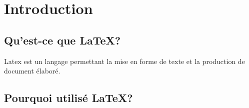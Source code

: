 \documentclass[../main.tex]{subfiles}
\begin{document}
\chapter{Introduction}

\section{Qu'est-ce que \LaTeX ?}

Latex est un langage permettant la mise en forme de texte et la production de document élaboré.

\section{Pourquoi utilisé \LaTeX ?}
\end{document}
